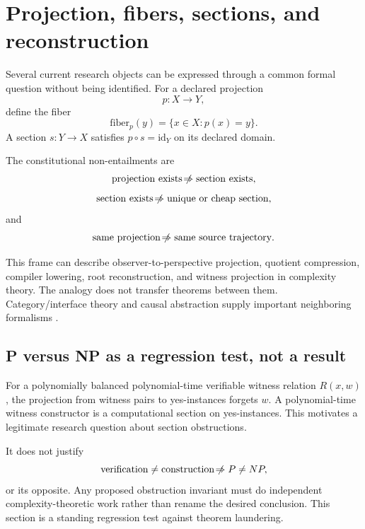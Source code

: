 \section{Projection, fibers, sections, and reconstruction}

Several current research objects can be expressed through a common formal question without being identified. For a declared projection
\begin{equation}
p:X\rightarrow Y,
\end{equation}
define the fiber
\begin{equation}
\mathrm{fiber}_p(y)=\{x\in X:p(x)=y\}.
\end{equation}
A section $s:Y\rightarrow X$ satisfies $p\circ s=\mathrm{id}_Y$ on its declared domain.

The constitutional non-entailments are
\begin{equation}
\text{projection exists}\mathrel{\not\!\Rightarrow}\text{section exists},
\end{equation}
\begin{equation}
\text{section exists}\mathrel{\not\!\Rightarrow}\text{unique or cheap section},
\end{equation}
and
\begin{equation}
\text{same projection}\mathrel{\not\!\Rightarrow}\text{same source trajectory}.
\end{equation}

This frame can describe observer-to-perspective projection, quotient compression, compiler lowering, root reconstruction, and witness projection in complexity theory. The analogy does not transfer theorems between them. Category/interface theory and causal abstraction supply important neighboring formalisms \cite{VagnerSpivakLerman2015,NiuSpivak2021,BaezCourser2020,GeigerEtAl2024,XiaBareinboim2025}.

\subsection{P versus NP as a regression test, not a result}

For a polynomially balanced polynomial-time verifiable witness relation $R(x,w)$, the projection from witness pairs to yes-instances forgets $w$. A polynomial-time witness constructor is a computational section on yes-instances. This motivates a legitimate research question about section obstructions.

It does not justify
\begin{equation}
\text{verification}\neq\text{construction}\mathrel{\not\!\Rightarrow} P\neq NP,
\end{equation}
or its opposite. Any proposed obstruction invariant must do independent complexity-theoretic work rather than rename the desired conclusion. This section is a standing regression test against theorem laundering.

